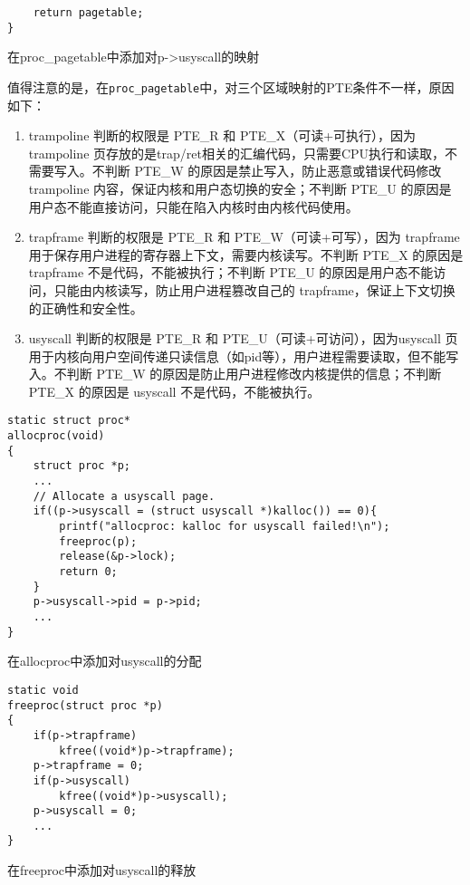 {\begin{listing}[!htb]
\begin{verbatim}
    return pagetable;
}
	\end{verbatim}
	\caption{在proc\_pagetable中添加对p->usyscall的映射}\label{lst:proc_pagetable}
\end{listing}

值得注意的是，在\texttt{proc\_pagetable}中，对三个区域映射的PTE条件不一样，原因如下：
\begin{enumerate}
	\item trampoline 判断的权限是 PTE\_R 和 PTE\_X（可读+可执行），因为 trampoline 页存放的是trap/ret相关的汇编代码，只需要CPU执行和读取，不需要写入。不判断 PTE\_W 的原因是禁止写入，防止恶意或错误代码修改 trampoline 内容，保证内核和用户态切换的安全；不判断 PTE\_U 的原因是用户态不能直接访问，只能在陷入内核时由内核代码使用。
	
	\item trapframe 判断的权限是 PTE\_R 和 PTE\_W（可读+可写），因为 trapframe 用于保存用户进程的寄存器上下文，需要内核读写。不判断 PTE\_X 的原因是 trapframe 不是代码，不能被执行；不判断 PTE\_U 的原因是用户态不能访问，只能由内核读写，防止用户进程篡改自己的 trapframe，保证上下文切换的正确性和安全性。
	
	\item usyscall 判断的权限是 PTE\_R 和 PTE\_U（可读+可访问），因为usyscall 页用于内核向用户空间传递只读信息（如pid等），用户进程需要读取，但不能写入。不判断 PTE\_W 的原因是防止用户进程修改内核提供的信息；不判断 PTE\_X 的原因是 usyscall 不是代码，不能被执行。
	
\end{enumerate}

\begin{listing}[!htb]
	\begin{verbatim}
static struct proc*
allocproc(void)
{
    struct proc *p;
    ...
    // Allocate a usyscall page.
    if((p->usyscall = (struct usyscall *)kalloc()) == 0){
        printf("allocproc: kalloc for usyscall failed!\n");
        freeproc(p);
        release(&p->lock);
        return 0;
    }
    p->usyscall->pid = p->pid;
    ...
}
	\end{verbatim}
	\caption{在allocproc中添加对usyscall的分配}\label{lst:allocproc}
\end{listing}

\begin{listing}[!htb]
	\begin{verbatim}
static void
freeproc(struct proc *p)
{
    if(p->trapframe)
        kfree((void*)p->trapframe);
    p->trapframe = 0;
    if(p->usyscall)
        kfree((void*)p->usyscall);
    p->usyscall = 0;
    ...
}
	\end{verbatim}
	\caption{在freeproc中添加对usyscall的释放}\label{lst:freeproc}
\end{listing}

}
